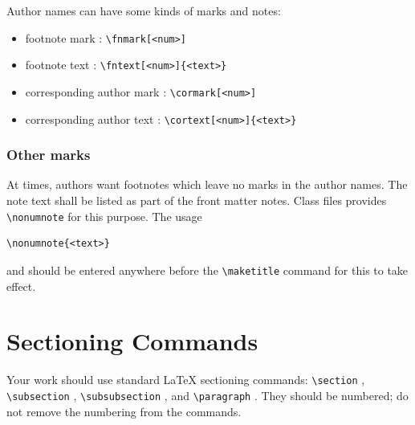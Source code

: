 \documentclass[%
twocolumn
]{ceurart}
\begin{document}
Author names can have some kinds of marks and notes:
\begin{itemize}
\item footnote mark :
\verb|\fnmark[<num>]|

\item footnote text :
\verb|\fntext[<num>]{<text>}|

\item corresponding author mark :
\verb|\cormark[<num>]|

\item corresponding author text :
\verb|\cortext[<num>]{<text>}|

\end{itemize}

\subsubsection{Other marks}

At times, authors want footnotes which leave no marks in the author names. The note text shall be listed as part of the front matter notes. Class files provides
\verb|\nonumnote|
 for this purpose. The usage
\begin{lstlisting}[language={[latex]TeX}]
\nonumnote{<text>}
\end{lstlisting}
and should be entered anywhere before the
\verb|\maketitle|
 command for this to take effect.

\section{Sectioning Commands}

Your work should use standard \LaTeX{} sectioning commands:
\verb|\section|%
,
\verb|\subsection|%
,
\verb|\subsubsection|%
, and
\verb|\paragraph|%
.
They should be numbered; do not remove the numbering from the commands.
\end{document}
